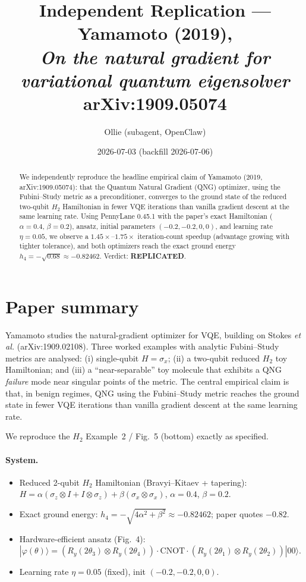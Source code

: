 \documentclass[11pt]{article}
\title{Independent Replication --- Yamamoto (2019),\\
\emph{On the natural gradient for variational quantum eigensolver}\\
\normalsize arXiv:1909.05074}
\author{Ollie (subagent, OpenClaw)}
\date{2026-07-03 (backfill 2026-07-06)}
\begin{document}
\maketitle

\begin{abstract}
We independently reproduce the headline empirical claim of Yamamoto (2019, arXiv:1909.05074): that
the Quantum Natural Gradient (QNG) optimizer, using the Fubini--Study metric as a preconditioner,
converges to the ground state of the reduced two-qubit $H_2$ Hamiltonian in fewer VQE iterations
than vanilla gradient descent at the same learning rate. Using PennyLane 0.45.1 with the
paper's exact Hamiltonian ($\alpha=0.4$, $\beta=0.2$), ansatz, initial parameters
$(-0.2,-0.2,0,0)$, and learning rate $\eta=0.05$, we observe a $1.45\times$--$1.75\times$
iteration-count speedup (advantage growing with tighter tolerance), and both optimizers reach the
exact ground energy $h_4=-\sqrt{0.68}\approx -0.82462$. Verdict: \textbf{REPLICATED}.
\end{abstract}

\section{Paper summary}
Yamamoto studies the natural-gradient optimizer for VQE, building on Stokes \emph{et al.}
(arXiv:1909.02108). Three worked examples with analytic Fubini--Study metrics are analysed:
(i) single-qubit $H=\sigma_x$; (ii) a two-qubit reduced $H_2$ toy Hamiltonian; and (iii) a
``near-separable'' toy molecule that exhibits a QNG \emph{failure} mode near singular points of
the metric. The central empirical claim is that, in benign regimes, QNG using the
Fubini--Study metric reaches the ground state in fewer VQE iterations than vanilla gradient
descent at the same learning rate.

We reproduce the $H_2$ Example~2 / Fig.~5 (bottom) exactly as specified.

\paragraph{System.}
\begin{itemize}
  \item Reduced 2-qubit $H_2$ Hamiltonian (Bravyi--Kitaev + tapering):
    $H=\alpha(\sigma_z\otimes I + I\otimes\sigma_z) + \beta(\sigma_x\otimes\sigma_x)$,
    $\alpha=0.4$, $\beta=0.2$.
  \item Exact ground energy: $h_4=-\sqrt{4\alpha^2+\beta^2}\approx-0.82462$; paper quotes $-0.82$.
  \item Hardware-efficient ansatz (Fig.~4):
    $|\varphi(\theta)\rangle=(R_y(2\theta_3)\otimes R_y(2\theta_4))\cdot\mathrm{CNOT}\cdot
    (R_y(2\theta_1)\otimes R_y(2\theta_2))|00\rangle$.
  \item Learning rate $\eta=0.05$ (fixed), init $(-0.2,-0.2,0,0)$.
\end{itemize}
\end{document}
